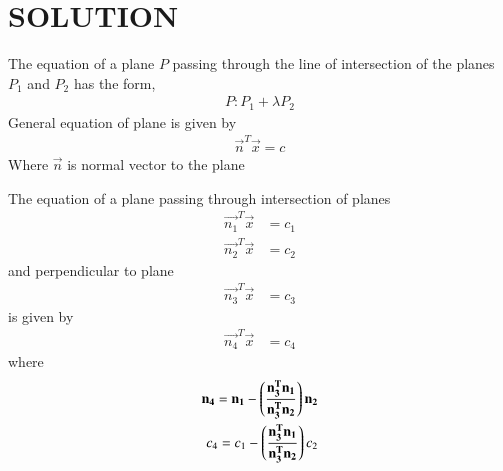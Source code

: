 \documentclass[journal,12pt,twocolumn]{IEEEtran}
\begin{document}
\section{SOLUTION}
%
The equation of a plane $P$ passing through the line of intersection of the planes $P_{1}$ and $P_{2}$ has the form,
\begin{align}
   P : P_{1} + \lambda P_{2}\label{eq1}
\end{align}
%
General equation of plane is given by
\begin{align}
    \vec{n}^T\vec{x}=c
\end{align}
Where $\vec{n}$ is normal vector to the plane
\begin{lemma}
   The equation of a plane passing through intersection of planes
   \begin{align}
    \vec{n_{1}}^T\vec{x}&=c_{1}\\ \vec{n_{2}}^T\vec{x}&=c_{2}
   \end{align}
   and perpendicular to plane
   \begin{align}
     \vec{n_{3}}^T\vec{x}&=c_{3}
   \end{align}
   is given by 
   \begin{align}
      \vec{n_{4}}^T\vec{x}&=c_{4}
   \end{align}
   where 
   \begin{align}
       \mathbf{n_{4}} = \mathbf{n_{1}} - \left(\frac{\mathbf{n_{3}^T\mathbf{n_1}}}{\mathbf{n_{3}^T\mathbf{n_2}}}\right)\mathbf{n_2}\\
       c_{4} = c_{1} - \left(\frac{\mathbf{n_{3}^T\mathbf{n_1}}}{\mathbf{n_{3}^T\mathbf{n_2}}}\right)c_{2}
   \end{align}
\end{lemma}
\end{document}

